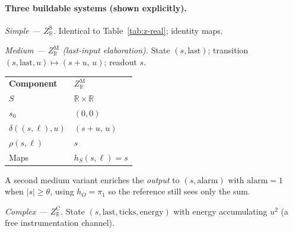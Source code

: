 \paragraph{Three buildable systems (shown explicitly).}

\textit{Simple --- $Z_{\mathbb{R}}^{\mathrm{S}}$.}
Identical to Table~\ref{tab:z-real}; identity maps.

\textit{Medium --- $Z_{\mathbb{R}}^{\mathrm{M}}$ (last-input elaboration).}
State $(s,\mathrm{last})$; transition $(s,\mathrm{last},u)\mapsto(s{+}u,\,u)$; readout $s$.

\begingroup
\renewcommand{\arraystretch}{1.2}
\footnotesize
\begin{center}
\begin{tabularx}{0.78\linewidth}{@{}>{\raggedright\arraybackslash}p{2.8cm}Y@{}}
    \headingfont\bfseries Component & \headingfont\bfseries $Z_{\mathbb{R}}^{\mathrm{M}}$ \\
    \addlinespace[2pt]
    $S$ & $\mathbb{R}\times\mathbb{R}$ \\
    \addlinespace[2pt]
    $s_0$ & $(0,0)$ \\
    \addlinespace[2pt]
    $\delta((s,\ell),u)$ & $(s{+}u,\,u)$ \\
    \addlinespace[2pt]
    $\rho(s,\ell)$ & $s$ \\
    \addlinespace[2pt]
    Maps & $h_S(s,\ell)=s$ \\
\end{tabularx}
\end{center}
\label{tab:z-real-med}
\endgroup
\vspace{4pt}

A second medium variant enriches the \emph{output} to $(s,\mathrm{alarm})$ with $\mathrm{alarm}=1$ when $|s|\ge\theta$, using $h_O=\pi_1$ so the reference still sees only the sum.

\textit{Complex --- $Z_{\mathbb{R}}^{\mathrm{C}}$.}
State $(s,\mathrm{last},\mathrm{ticks},\mathrm{energy})$ with energy accumulating $u^2$ (a free instrumentation channel).

